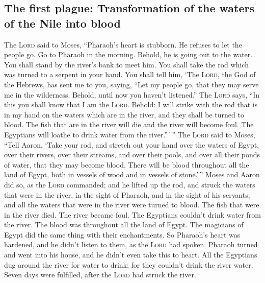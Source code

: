 \hypertarget{the-first-plague-transformation-of-the-waters-of-the-nile-into-blood}{%
\subsection{The first plague: Transformation of the waters of the Nile
into
blood}\label{the-first-plague-transformation-of-the-waters-of-the-nile-into-blood}}

 The \textsc{Lord} said to Moses, ``Pharaoh's heart is
stubborn. He refuses to let the people go.  Go to Pharaoh
in the morning. Behold, he is going out to the water. You shall stand by
the river's bank to meet him. You shall take the rod which was turned to
a serpent in your hand.  You shall tell him, `The
\textsc{Lord}, the God of the Hebrews, has sent me to you, saying, ``Let
my people go, that they may serve me in the wilderness. Behold, until
now you haven't listened.''  The \textsc{Lord} says, ``In
this you shall know that I am the \textsc{Lord}. Behold: I will strike
with the rod that is in my hand on the waters which are in the river,
and they shall be turned to blood.  The fish that are in
the river will die and the river will become foul. The Egyptians will
loathe to drink water from the river.''\,'\,''  The
\textsc{Lord} said to Moses, ``Tell Aaron, `Take your rod, and stretch
out your hand over the waters of Egypt, over their rivers, over their
streams, and over their pools, and over all their ponds of water, that
they may become blood. There will be blood throughout all the land of
Egypt, both in vessels of wood and in vessels of stone.'\,''
 Moses and Aaron did so, as the \textsc{Lord} commanded;
and he lifted up the rod, and struck the waters that were in the river,
in the sight of Pharaoh, and in the sight of his servants; and all the
waters that were in the river were turned to blood.  The
fish that were in the river died. The river became foul. The Egyptians
couldn't drink water from the river. The blood was throughout all the
land of Egypt.  The magicians of Egypt did the same thing
with their enchantments. So Pharaoh's heart was hardened, and he didn't
listen to them, as the \textsc{Lord} had spoken.  Pharaoh
turned and went into his house, and he didn't even take this to heart.
 All the Egyptians dug around the river for water to
drink; for they couldn't drink the river water.  Seven
days were fulfilled, after the \textsc{Lord} had struck the river.

